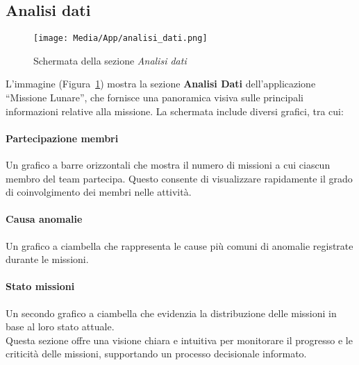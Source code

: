 \subsection{Analisi dati}

\begin{figure}[ht!]
    \centering
    \texttt{[image: Media/App/analisi\_dati.png]}
    \caption{Schermata della sezione \textit{Analisi dati}}
    \label{fig:analisi_dati}
\end{figure}

L'immagine (Figura~\ref{fig:analisi_dati}) mostra la sezione \textbf{Analisi Dati} dell'applicazione ``Missione Lunare'', che fornisce una panoramica visiva sulle principali informazioni relative alla missione. La schermata include diversi grafici, tra cui:

\paragraph*{Partecipazione membri}
Un grafico a barre orizzontali che mostra il numero di missioni a cui ciascun membro del team partecipa. Questo consente di visualizzare rapidamente il grado di coinvolgimento dei membri nelle attività.

\paragraph{Causa anomalie}
Un grafico a ciambella che rappresenta le cause più comuni di anomalie registrate durante le missioni.

\paragraph*{Stato missioni}
Un secondo grafico a ciambella che evidenzia la distribuzione delle missioni in base al loro stato attuale. \\

\noindent
Questa sezione offre una visione chiara e intuitiva per monitorare il progresso e le criticità delle missioni, supportando un processo decisionale informato.



